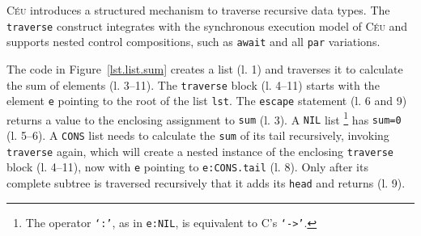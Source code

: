 \documentclass{sig-alternate}
\newcommand{\CEU}{\textsc{C\'{e}u}\xspace}
\newcommand{\code}[1] {{\small{\texttt{#1}}}}
\begin{document}
\CEU introduces a structured mechanism to traverse recursive data types.
The \code{traverse} construct integrates with the synchronous execution model 
of \CEU and supports nested control compositions, such as \code{await} and all 
\code{par} variations.

The code in Figure~\ref{lst.list.sum} creates a list (l. 1) and traverses it 
to calculate the sum of elements (l. 3--11).
The \code{traverse} block (l. 4--11) starts with the element \code{e} 
pointing to the root of the list \code{lst}.
The \code{escape} statement (l. 6 and 9) returns a value to the enclosing 
assignment to \code{sum} (l. 3).
A \code{NIL} list%
\footnote{
The operator \code{`:'}, as in \code{e:NIL}, is equivalent to C's \code{`->'}.
}
has \code{sum=0} (l. 5--6).
A \code{CONS} list needs to calculate the \code{sum} of its tail recursively, 
invoking \code{traverse} again, which will create a nested instance of the 
enclosing \code{traverse} block (l. 4--11), now with \code{e} pointing to 
\code{e:CONS.tail} (l. 8).
Only after its complete subtree is traversed recursively that it adds its 
\code{head} and returns (l. 9).
\end{document}
